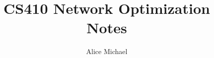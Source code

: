 \documentclass[11pt,letterpaper]{book}
\author{Alice Michael}
\title{CS410 Network Optimization Notes}
\date{}
\newcommand{\onlyinsubfile}[1]{#1}
\newcommand{\notinsubfile}[1]{}
\begin{document}
\renewcommand{\onlyinsubfile}[1]{}
\renewcommand{\notinsubfile}[1]{#1}


 \newpage

 \newpage

\end{document}
